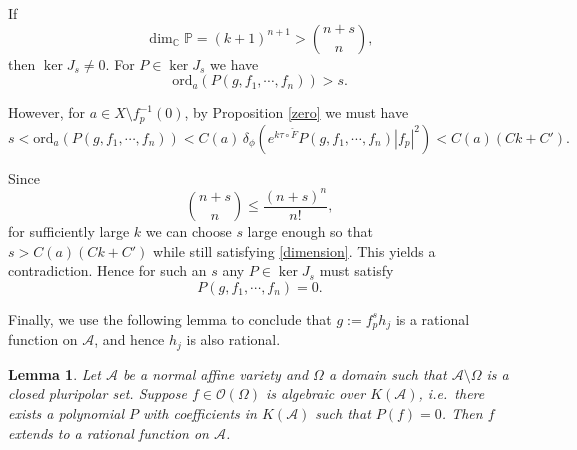 \documentclass[a4paper, 12pt]{article}
\newcommand{\cA}{\mathcal{A}}
\newtheorem{lem}[thm]{Lemma}
\begin{document}
If
\begin{equation}\label{dimension}
\dim_{\mathbb{C}}\mathbb{P}=(k+1)^{n+1}>\binom{n+s}{n},
\end{equation}
then $\ker J_s\neq 0$. For $P\in\ker J_s$ we have
\[
\mathrm{ord}_a(P(g,f_1,\cdots,f_n))>s.
\]

However, for $a\in X\setminus f_p^{-1}(0)$, by Proposition \ref{zero} we must have
\[
s<\mathrm{ord}_a(P(g,f_1,\cdots,f_n))
<
C(a)\,\delta_\phi\!\left(e^{k\tau\circ\check F}P(g,f_1,\cdots,f_n)|f_p|^2\right)
<
C(a)(Ck+C').
\]

Since
\[
\binom{n+s}{n}\le \frac{(n+s)^n}{n!},
\]
for sufficiently large $k$ we can choose $s$ large enough so that $s>C(a)(Ck+C')$ while still satisfying \eqref{dimension}. This yields a contradiction. Hence for such an $s$ any $P\in\ker J_s$ must satisfy
\[
P(g,f_1,\cdots,f_n)=0.
\]

Finally, we use the following lemma to conclude that $g:=f_p^s h_j$ is a rational function on $\cA$, and hence $h_j$ is also rational.

\begin{lem}\label{rationalext}
Let $\cA$ be a normal affine variety and $\Omega$ a domain such that $\cA\setminus\Omega$ is a closed pluripolar set. Suppose $f\in\mathcal{O}(\Omega)$ is algebraic over $K(\cA)$, i.e.\ there exists a polynomial $P$ with coefficients in $K(\cA)$ such that $P(f)=0$. Then $f$ extends to a rational function on $\cA$.
\end{lem}
\end{document}
